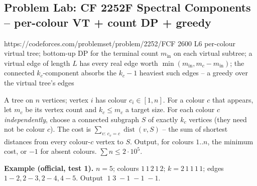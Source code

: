 \subsection{Problem Lab: CF 2252F Spectral Components -- per-colour VT + count DP + greedy}

  {https://codeforces.com/problemset/problem/2252/F}{CF 2600 L6}
  {per-colour virtual tree; bottom-up DP for the terminal count \(m_{\text{in}}\) on each
   virtual subtree; a virtual edge of length \(L\) has every real edge worth
   \(\min(m_{\text{in}}, m_c-m_{\text{in}})\); the connected \(k_c\)-component absorbs the
   \(k_c-1\) heaviest such edges -- a greedy over the virtual tree's edges}

\begin{problemstatement}
A tree on \(n\) vertices; vertex \(i\) has colour \(c_i\in[1,n]\).  For a colour \(c\)
that appears, let \(m_c\) be its vertex count and \(k_c\le m_c\) a target size.  For
each colour \(c\) \emph{independently}, choose a connected subgraph \(S\) of exactly
\(k_c\) vertices (they need not be colour \(c\)).  The cost is \(\sum_{v:\,c_v=c}
\operatorname{dist}(v,S)\) -- the sum of shortest distances from every colour-\(c\)
vertex to \(S\).  Output, for colours \(1..n\), the minimum cost, or \(-1\) for absent
colours.  \(\sum n\le 2\cdot10^5\).

\textbf{Example (official, test 1).} \(n=5\); colours \(1\,1\,2\,1\,2\); \(k=2\,1\,1\,1\,1\);
edges \(1\!-\!2,2\!-\!3,2\!-\!4,4\!-\!5\).  Output \(\;1\;3\;-1\;-1\;-1\).
\end{problemstatement}

